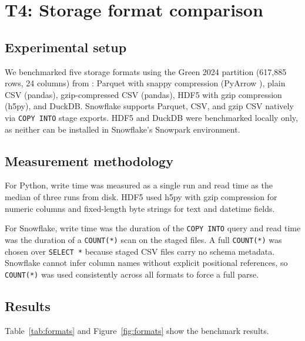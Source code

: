 \documentclass[fleqn,moreauthors,9pt]{ds_report}
\begin{document}
\section*{T4: Storage format comparison}

\subsection*{Experimental setup}

We benchmarked five storage formats using the Green 2024 partition (617,885 rows, 24 columns) from : Parquet with snappy compression (PyArrow \cite{arrow2024}), plain CSV (pandas), gzip-compressed CSV (pandas), HDF5 with gzip compression (h5py), and DuckDB. Snowflake supports Parquet, CSV, and gzip CSV natively via \texttt{COPY INTO} stage exports. HDF5 and DuckDB were benchmarked locally only, as neither can be installed in Snowflake's Snowpark environment.

\subsection*{Measurement methodology}

For Python, write time was measured as a single run and read time as the median of three runs from disk. HDF5 used h5py with gzip compression for numeric columns and fixed-length byte strings for text and datetime fields.

For Snowflake, write time was the duration of the \texttt{COPY INTO} query and read time was the duration of a \texttt{COUNT(*)} scan on the staged files. A full \texttt{COUNT(*)} was chosen over \texttt{SELECT *} because staged CSV files carry no schema metadata. Snowflake cannot infer column names without explicit positional references, so \texttt{COUNT(*)} was used consistently across all formats to force a full parse.

\subsection*{Results}

Table~\ref{tab:formats} and Figure~\ref{fig:formats} show the benchmark results.
\end{document}
